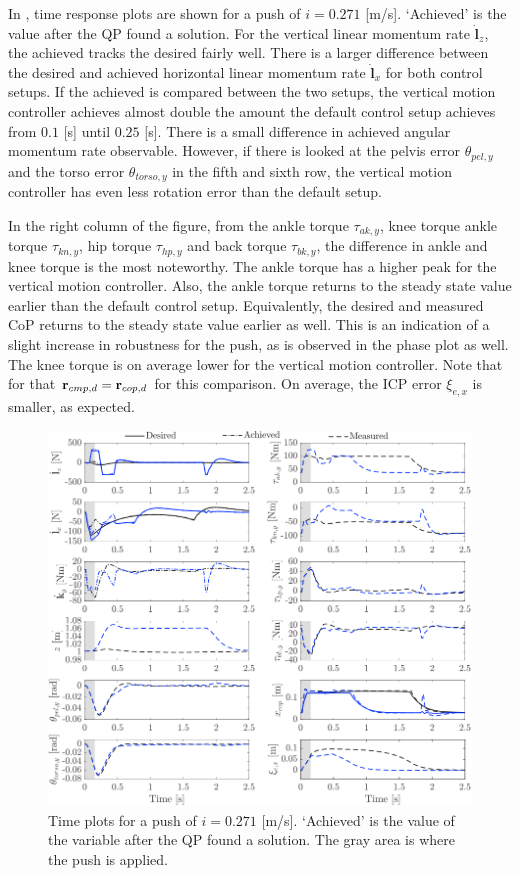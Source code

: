 In , time response plots are shown for a push of $i=0.271$ [m/s]. `Achieved' is the value after the \ac{QP} found a solution. For the vertical linear momentum rate $\dot{\mathbf{l}}_z$, the achieved tracks the desired fairly well. There is a larger difference between the desired and achieved horizontal linear momentum rate $\dot{\mathbf{l}}_x$ for both control setups. If the achieved is compared between the two setups, the vertical motion controller achieves almost double the amount the default control setup achieves from $0.1$ [s] until $0.25$ [s]. There is a small difference in achieved angular momentum rate observable. However, if there is looked at the pelvis error $\theta_{pel,y}$ and the torso error $\theta_{torso,y}$ in the fifth and sixth row, the vertical motion controller has even less rotation error than the default setup. 

In the right column of the figure, from the ankle torque $\tau_{ak,y}$, knee torque ankle torque $\tau_{kn,y}$, hip torque $\tau_{hp,y}$ and back torque $\tau_{bk,y}$, the difference in ankle and knee torque is the most noteworthy. The ankle torque has a higher peak for the vertical motion controller. Also, the ankle torque returns to the steady state value earlier than the default control setup. Equivalently, the desired and measured \ac{CoP} returns to the steady state value earlier as well. This is an indication of a slight increase in robustness for the push, as is observed in the phase plot as well. The knee torque is on average lower for the vertical motion controller. Note that for that $\mathbf{r}_{cmp,d}=\mathbf{r}_{cop,d}$ for this comparison. On average, the \ac{ICP} error $\xi_{e,x}$ is smaller, as expected.
\begin{figure}[h]
\centering
\includegraphics[width=1.0\textwidth]{STYLESTUFF/valcomparetime.png}
\caption{Time plots for a push of $i=0.271$ [m/s]. `Achieved' is the value of the variable after the \ac{QP} found a solution. The gray area is where the push is applied.}
\label{fig:valcomparetime}
\end{figure}

